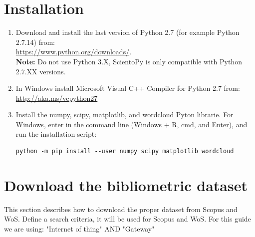 \documentclass[10pt,letterpaper]{article}
\begin{document}
\section{Installation}

\begin{enumerate}
\item Download and install the last version of Python 2.7 (for example Python 2.7.14) from: \\ \url{https://www.python.org/downloads/}.\\
\textbf{Note: } Do not use Python 3.X, ScientoPy is only compatible with Python 2.7.XX versions.
\item In Windows install Microsoft Visual C++ Compiler for Python 2.7 from: \url{http://aka.ms/vcpython27}
\item Install the  numpy, scipy, matplotlib, and wordcloud Pyton librarie. For Windows, enter in the command line (Windows + R, cmd, and Enter), and run the installation script:
\begin{verbatim}
python -m pip install --user numpy scipy matplotlib wordcloud
\end{verbatim}
\end{enumerate}

\section{Download the bibliometric dataset}
This section describes how to download the proper dataset from Scopus and WoS. Define a search criteria, it will be used for Scopus and WoS. For this guide we are using: "Internet of thing"  AND  "Gateway" 
\end{document}
